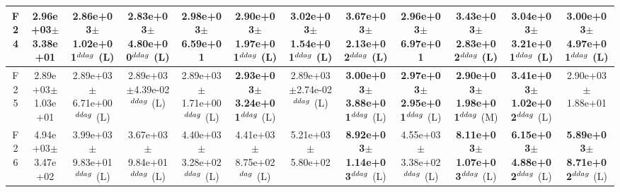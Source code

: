 \begin{table}[!t]
\begin{tabular}{c|ccccccccccc}
F24  & 2.96e+03$\pm$3.38e+01  & 2.86e+03$\pm$1.02e+01$^{\\ddag}$ (L)  & 2.83e+03$\pm$4.80e+00$^{\\ddag}$ (L)  & 2.98e+03$\pm$6.59e+01   & 2.90e+03$\pm$1.97e+01$^{\\ddag}$ (L)  & \textbf{3.02e+03$\pm$1.54e+01}$^{\\ddag}$ (L)  & \textbf{3.67e+03$\pm$2.13e+02}$^{\\ddag}$ (L)  & 2.96e+03$\pm$6.97e+01   & \textbf{3.43e+03$\pm$2.83e+02}$^{\\ddag}$ (L)  & \textbf{3.04e+03$\pm$3.21e+01}$^{\\ddag}$ (L)  & \textbf{3.00e+03$\pm$4.97e+01}$^{\\ddag}$ (L) \\ \hline
F25  & 2.89e+03$\pm$1.03e+01  & 2.89e+03$\pm$6.71e+00$^{\\ddag}$ (L)  & 2.89e+03$\pm$4.39e-02$^{\\ddag}$ (L)  & 2.89e+03$\pm$1.71e+00$^{\\ddag}$ (L)  & \textbf{2.93e+03$\pm$3.24e+01}$^{\\ddag}$ (L)  & 2.89e+03$\pm$2.74e-02$^{\\ddag}$ (L)  & \textbf{3.00e+03$\pm$3.88e+01}$^{\\ddag}$ (L)  & \textbf{2.97e+03$\pm$2.95e+01}$^{\\ddag}$ (L)  & \textbf{2.90e+03$\pm$1.98e+01}$^{\\ddag}$ (M)  & \textbf{3.41e+03$\pm$1.02e+02}$^{\\ddag}$ (L)  & 2.90e+03$\pm$1.88e+01  \\ \hline
F26  & 4.94e+03$\pm$3.47e+02  & 3.99e+03$\pm$9.83e+01$^{\\ddag}$ (L)  & 3.67e+03$\pm$9.84e+01$^{\\ddag}$ (L)  & 4.40e+03$\pm$3.28e+02$^{\\ddag}$ (L)  & 4.41e+03$\pm$8.75e+02$^{\\dag}$ (L)  & 5.21e+03$\pm$5.80e+02   & \textbf{8.92e+03$\pm$1.14e+03}$^{\\ddag}$ (L)  & 4.55e+03$\pm$3.38e+02$^{\\ddag}$ (L)  & \textbf{8.11e+03$\pm$1.07e+03}$^{\\ddag}$ (L)  & \textbf{6.15e+03$\pm$4.88e+02}$^{\\ddag}$ (L)  & \textbf{5.89e+03$\pm$8.71e+02}$^{\\ddag}$ (L) \\ \hline

\end{tabular}
\end{table}

